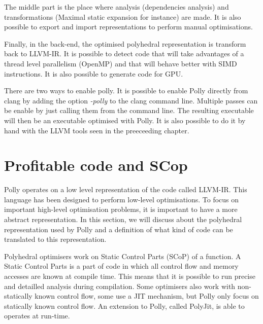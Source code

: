 The middle part is the place where analysis (dependencies analysis) and transformations (Maximal static expansion for instance) are made. It is also possible to export and import representations to perform manual optimisations.

Finally, in the back-end, the optimised polyhedral representation is transform back to LLVM-IR. It is possible to detect code that will take advantages of a thread level parallelism (OpenMP) and that will behave better with SIMD instructions. It is also possible to generate code for GPU. 

There are two ways to enable polly. It is possible to enable Polly directly from clang by adding the option \emph{-polly} to the clang command line. Multiple passes can be enable by just calling them from the command line. The resulting executable will then be an executable optimised with Polly. It is also possible to do it by hand with the LLVM tools seen in the preeceeding chapter.

\section{Profitable code and SCop}
Polly operates on a low level representation of the code called LLVM-IR. This language has been designed to perform low-level optimisations. To focus on important high-level optimisation problems, it is important to have a more abstract representation. In this section, we will discuss about the polyhedral representation used by Polly and a definition of what kind of code can be translated to this representation.

Polyhedral optimisers work on Static Control Parts (SCoP) of a function. A Static Control Parts is a part of code in which all control flow and memory accesses are known at compile time. This means that it is possible to run precise and detailled analysis during compilation. Some optimisers also work with non-statically known control flow, some use a \ac{JIT} mechanism, but Polly only focus on statically known control flow. An extension to Polly, called PolyJit\cite{PolyJit}, is able to operates at run-time.

